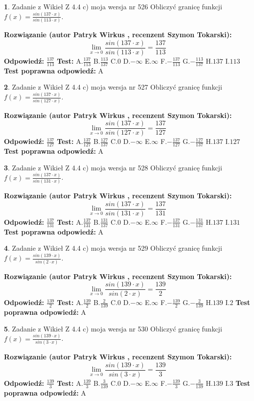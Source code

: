 \documentclass[12pt, a4paper]{article}
\theoremstyle{definition} %
\newtheorem{zad}{}
\newcommand{\zadStart}[1]{\begin{zad}#1\newline}
\newcommand{\zadStop}{\end{zad}}
\newcommand{\rozwStart}[2]{\noindent \textbf{Rozwiązanie (autor #1 , recenzent #2): }\newline}
\newcommand{\rozwStop}{\newline}
\newcommand{\odpStart}{\noindent \textbf{Odpowiedź:}\newline}
\newcommand{\odpStop}{\newline}
\newcommand{\testStart}{\noindent \textbf{Test:}\newline}
\newcommand{\testStop}{\newline}
\newcommand{\kluczStart}{\noindent \textbf{Test poprawna odpowiedź:}\newline}
\newcommand{\kluczStop}{\newline}
\begin{document}
\zadStart{Zadanie z Wikieł Z 4.4 c) moja wersja nr 526}
Obliczyć granicę funkcji $f(x)=\frac{sin(137\cdot x)}{sin(113\cdot x)}$.
\zadStop
\rozwStart{Patryk Wirkus}{Szymon Tokarski}
$$\lim\limits_{x\to 0}\frac{sin(137\cdot x)}{sin(113\cdot x)}=
\frac{137}{113}$$
\rozwStop
\odpStart
$\frac{137}{113}$
\odpStop
\testStart
A.$\frac{137}{113}$
B.$\frac{113}{137}$
C.$0$
D.$-\infty$
E.$\infty$
F.$-\frac{137}{113}$
G.$-\frac{113}{137}$
H.$137$
I.$113$
\testStop
\kluczStart
A
\kluczStop



\zadStart{Zadanie z Wikieł Z 4.4 c) moja wersja nr 527}
Obliczyć granicę funkcji $f(x)=\frac{sin(137\cdot x)}{sin(127\cdot x)}$.
\zadStop
\rozwStart{Patryk Wirkus}{Szymon Tokarski}
$$\lim\limits_{x\to 0}\frac{sin(137\cdot x)}{sin(127\cdot x)}=
\frac{137}{127}$$
\rozwStop
\odpStart
$\frac{137}{127}$
\odpStop
\testStart
A.$\frac{137}{127}$
B.$\frac{127}{137}$
C.$0$
D.$-\infty$
E.$\infty$
F.$-\frac{137}{127}$
G.$-\frac{127}{137}$
H.$137$
I.$127$
\testStop
\kluczStart
A
\kluczStop



\zadStart{Zadanie z Wikieł Z 4.4 c) moja wersja nr 528}
Obliczyć granicę funkcji $f(x)=\frac{sin(137\cdot x)}{sin(131\cdot x)}$.
\zadStop
\rozwStart{Patryk Wirkus}{Szymon Tokarski}
$$\lim\limits_{x\to 0}\frac{sin(137\cdot x)}{sin(131\cdot x)}=
\frac{137}{131}$$
\rozwStop
\odpStart
$\frac{137}{131}$
\odpStop
\testStart
A.$\frac{137}{131}$
B.$\frac{131}{137}$
C.$0$
D.$-\infty$
E.$\infty$
F.$-\frac{137}{131}$
G.$-\frac{131}{137}$
H.$137$
I.$131$
\testStop
\kluczStart
A
\kluczStop



\zadStart{Zadanie z Wikieł Z 4.4 c) moja wersja nr 529}
Obliczyć granicę funkcji $f(x)=\frac{sin(139\cdot x)}{sin(2\cdot x)}$.
\zadStop
\rozwStart{Patryk Wirkus}{Szymon Tokarski}
$$\lim\limits_{x\to 0}\frac{sin(139\cdot x)}{sin(2\cdot x)}=
\frac{139}{2}$$
\rozwStop
\odpStart
$\frac{139}{2}$
\odpStop
\testStart
A.$\frac{139}{2}$
B.$\frac{2}{139}$
C.$0$
D.$-\infty$
E.$\infty$
F.$-\frac{139}{2}$
G.$-\frac{2}{139}$
H.$139$
I.$2$
\testStop
\kluczStart
A
\kluczStop



\zadStart{Zadanie z Wikieł Z 4.4 c) moja wersja nr 530}
Obliczyć granicę funkcji $f(x)=\frac{sin(139\cdot x)}{sin(3\cdot x)}$.
\zadStop
\rozwStart{Patryk Wirkus}{Szymon Tokarski}
$$\lim\limits_{x\to 0}\frac{sin(139\cdot x)}{sin(3\cdot x)}=
\frac{139}{3}$$
\rozwStop
\odpStart
$\frac{139}{3}$
\odpStop
\testStart
A.$\frac{139}{3}$
B.$\frac{3}{139}$
C.$0$
D.$-\infty$
E.$\infty$
F.$-\frac{139}{3}$
G.$-\frac{3}{139}$
H.$139$
I.$3$
\testStop
\kluczStart
A
\kluczStop
\end{document}
